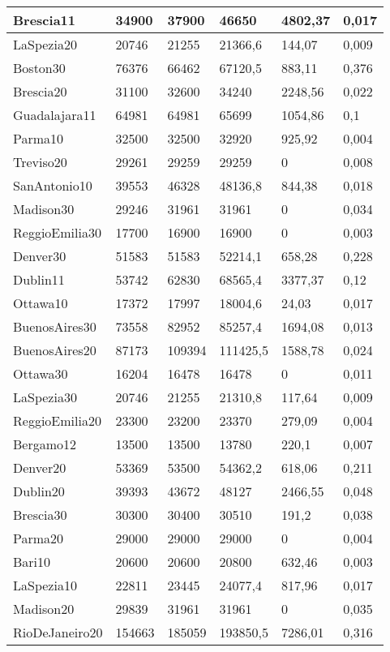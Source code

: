 \begin{longtable}[c]{|l|l|l|l|l|l|}
Brescia11 & 34900 & 37900 & 46650 & 4802,37 & 0,017 \\ \hline
LaSpezia20 & 20746 & 21255 & 21366,6 & 144,07 & 0,009 \\ \hline
Boston30 & 76376 & 66462 & 67120,5 & 883,11 & 0,376 \\ \hline
Brescia20 & 31100 & 32600 & 34240 & 2248,56 & 0,022 \\ \hline
Guadalajara11 & 64981 & 64981 & 65699 & 1054,86 & 0,1 \\ \hline
Parma10 & 32500 & 32500 & 32920 & 925,92 & 0,004 \\ \hline
Treviso20 & 29261 & 29259 & 29259 & 0 & 0,008 \\ \hline
SanAntonio10 & 39553 & 46328 & 48136,8 & 844,38 & 0,018 \\ \hline
Madison30 & 29246 & 31961 & 31961 & 0 & 0,034 \\ \hline
ReggioEmilia30 & 17700 & 16900 & 16900 & 0 & 0,003 \\ \hline
Denver30 & 51583 & 51583 & 52214,1 & 658,28 & 0,228 \\ \hline
Dublin11 & 53742 & 62830 & 68565,4 & 3377,37 & 0,12 \\ \hline
Ottawa10 & 17372 & 17997 & 18004,6 & 24,03 & 0,017 \\ \hline
BuenosAires30 & 73558 & 82952 & 85257,4 & 1694,08 & 0,013 \\ \hline
BuenosAires20 & 87173 & 109394 & 111425,5 & 1588,78 & 0,024 \\ \hline
Ottawa30 & 16204 & 16478 & 16478 & 0 & 0,011 \\ \hline
LaSpezia30 & 20746 & 21255 & 21310,8 & 117,64 & 0,009 \\ \hline
ReggioEmilia20 & 23300 & 23200 & 23370 & 279,09 & 0,004 \\ \hline
Bergamo12 & 13500 & 13500 & 13780 & 220,1 & 0,007 \\ \hline
Denver20 & 53369 & 53500 & 54362,2 & 618,06 & 0,211 \\ \hline
Dublin20 & 39393 & 43672 & 48127 & 2466,55 & 0,048 \\ \hline
Brescia30 & 30300 & 30400 & 30510 & 191,2 & 0,038 \\ \hline
Parma20 & 29000 & 29000 & 29000 & 0 & 0,004 \\ \hline
Bari10 & 20600 & 20600 & 20800 & 632,46 & 0,003 \\ \hline
LaSpezia10 & 22811 & 23445 & 24077,4 & 817,96 & 0,017 \\ \hline
Madison20 & 29839 & 31961 & 31961 & 0 & 0,035 \\ \hline
RioDeJaneiro20 & 154663 & 185059 & 193850,5 & 7286,01 & 0,316 \\ \hline
\end{longtable}

